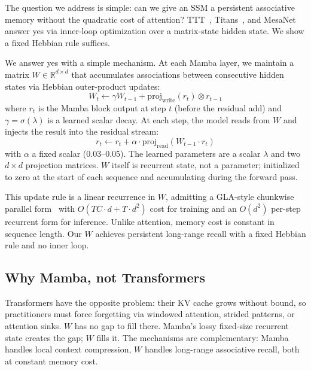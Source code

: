 \documentclass{article}
\begin{document}
The question we address is simple: can we give an SSM a persistent associative memory without the quadratic cost of attention? TTT~\citep{sun2024learning}, Titans~\citep{behrouz2024titans}, and MesaNet~\citep{von2025mesanet} answer yes via inner-loop optimization over a matrix-state hidden state. We show a fixed Hebbian rule suffices.

We answer yes with a simple mechanism. At each Mamba layer, we maintain a matrix $W \in \mathbb{R}^{d \times d}$ that accumulates associations between consecutive hidden states via Hebbian outer-product updates:
\begin{equation}
    W_t \leftarrow \gamma W_{t-1} + \text{proj}_\text{write}(r_t) \otimes r_{t-1}
\end{equation}
where $r_t$ is the Mamba block output at step $t$ (before the residual add) and $\gamma = \sigma(\lambda)$ is a learned scalar decay. At each step, the model reads from $W$ and injects the result into the residual stream:
\begin{equation}
    r_t \leftarrow r_t + \alpha \cdot \text{proj}_\text{read}(W_{t-1} \cdot r_t)
\end{equation}
with $\alpha$ a fixed scalar (0.03--0.05). The learned parameters are a scalar $\lambda$ and two $d \times d$ projection matrices. $W$ itself is recurrent state, not a parameter; initialized to zero at the start of each sequence and accumulating during the forward pass.

This update rule is a linear recurrence in $W$, admitting a GLA-style chunkwise parallel form~\citep{yang2023gated} with $O(TC \cdot d + T \cdot d^2)$ cost for training and an $O(d^2)$ per-step recurrent form for inference. Unlike attention, memory cost is constant in sequence length. Our $W$ achieves persistent long-range recall with a fixed Hebbian rule and no inner loop.

\subsection*{Why Mamba, not Transformers}
Transformers have the opposite problem: their KV cache grows without bound, so practitioners must force forgetting via windowed attention, strided patterns, or attention sinks. $W$ has no gap to fill there. Mamba's lossy fixed-size recurrent state creates the gap; $W$ fills it. The mechanisms are complementary: Mamba handles local context compression, $W$ handles long-range associative recall, both at constant memory cost.
\end{document}
